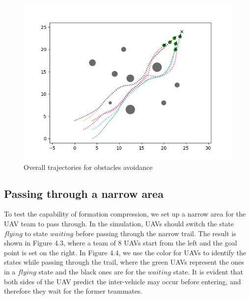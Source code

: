\begin{figure}[H]
    \centering
    \includegraphics[scale=0.7]{figures/exp1-3.png}
    \caption{Overall trajectories for obstacles avoidance}
    \label{fig:fig_label}
\end{figure}

\subsection{Passing through a narrow area}
To test the capability of formation compression, we set up a narrow area for the UAV team to pass through. In the simulation, UAVs should switch the state $flying$ to state $waiting$ before passing through the narrow trail. The result is shown in Figure 4.3, where a team of 8 UAVs start from the left and the goal point is set on the right. In Figure 4.4, we use the color for UAVs to identify the states while passing through the trail, where the green UAVs represent the ones in a $flying$ state and the black ones are for the $waiting$ state. It is evident that both sides of the UAV predict the inter-vehicle may occur before entering, and therefore they wait for the former teammates.

